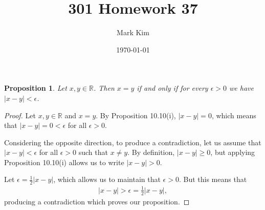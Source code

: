 \documentclass[12pt]{amsart}
\title{301 Homework 37}
\author{Mark Kim}
\date{\today}
\newcommand{\R}{\mathbb{R}}
\newtheorem*{proposition}{Proposition}
\begin{document}
\maketitle

\begin{proposition}
Let $x,y\in\R$.  Then $x=y$ if and only if for every $\epsilon > 0$ we have $\lvert x-y\rvert < \epsilon$.
\end{proposition}

\begin{proof}
Let $x,y\in\R$ and $x=y$.  By Proposition 10.10(i), $\lvert x-y\rvert = 0$, which means that  $\lvert x-y\rvert = 0 < \epsilon$ for all $\epsilon > 0$.

Considering the opposite direction, to produce a contradiction, let us assume that $\lvert x-y\rvert < \epsilon$ for all $\epsilon > 0$  such that $x\neq y$.  By definition, $\lvert x-y\rvert \geq 0$, but applying Proposition 10.10(i) allows us to write $\lvert x-y\rvert > 0$.

Let $\epsilon = \frac{1}{2}\lvert x-y\rvert$, which allows us to maintain that $\epsilon > 0$.  But this means that
\begin{align*}
\lvert x-y\rvert > \epsilon = \frac{1}{2}\lvert x-y\rvert,
\end{align*}
producing a contradiction which proves our proposition.
\end{proof}
\end{document}
